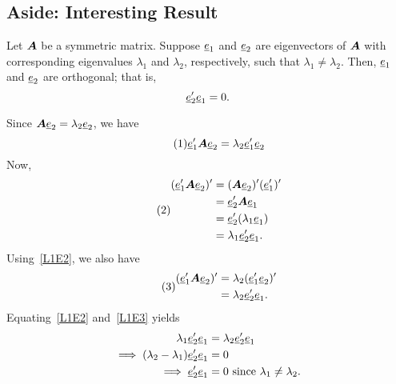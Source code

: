 \subsection*{Aside: Interesting Result}
Let $ \bm{A} $ be a symmetric matrix. Suppose $ \underline{e}_1 $ and $ \underline{e}_2 $ are eigenvectors
of $ \bm{A} $ with corresponding eigenvalues $ \lambda_1 $ and $ \lambda_2 $, respectively, such that
$ \lambda_1\ne \lambda_2 $. Then, $ \underline{e}_1 $ and $ \underline{e}_2 $ are orthogonal; that is,
\[ \underline{e}_2'\underline{e}_1=0. \]
\begin{framed}
      Since $ \bm{A}\underline{e}_2=\lambda_2 \underline{e}_2 $, we have
      \begin{equation}\tag*{(1)}\label{L1E1}
            \underline{e}_1' \bm{A}\underline{e}_2=\lambda_2 \underline{e}_1'\underline{e}_2
      \end{equation}
      Now,
      \begin{equation}\tag*{(2)}\label{L1E2}
            \begin{aligned}
                  (\underline{e}_1' \bm{A}\underline{e}_2)'
                   & =(\bm{A}\underline{e}_2)'(\underline{e}_1')' \\
                   & =\underline{e}_2' \bm{A}\underline{e}_1      \\
                   & =\underline{e}_2'(\lambda_1 \underline{e}_1)     \\
                   & =\lambda_1 \underline{e}_2' \underline{e}_1.
            \end{aligned}
      \end{equation}
      Using~\ref{L1E2}, we also have
      \begin{equation}\tag*{(3)}\label{L1E3}
            \begin{aligned}
                  (\underline{e}_1' \bm{A}\underline{e}_2)'
                   & =\lambda_2(\underline{e}_1'\underline{e}_2)' \\
                   & =\lambda_2 \underline{e}_2'\underline{e}_1.
            \end{aligned}
      \end{equation}
      Equating~\ref{L1E2} and~\ref{L1E3} yields
      \begin{align*}
            \lambda_1 \underline{e}_2'\underline{e}_1                     & =\lambda_2 \underline{e}_2'\underline{e}_1        \\
            \implies (\lambda_2-\lambda_1)\underline{e}_2'\underline{e}_1 & =0                                          \\
            \implies \underline{e}_2'\underline{e}_1                      & =0\text{ since $ \lambda_1\ne \lambda_2 $}.
      \end{align*}
\end{framed}
